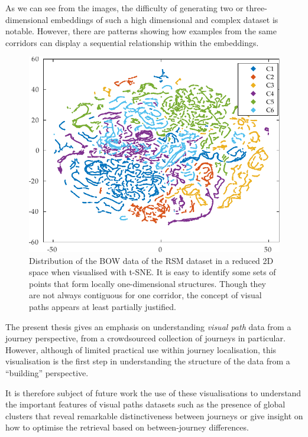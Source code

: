 As we can see from the images, the difficulty of generating two or three-dimensional embeddings of such a high dimensional and complex dataset is notable. However, there are patterns showing how examples from the same corridors can display a sequential relationship within the embeddings.


\begin{figure}
\centering
\includegraphics[width=\textwidth]{gfx/Chapter04/tsne_dsift_2d.pdf}
\caption{Distribution of the BOW data of the RSM dataset in a reduced 2D space when visualised with t-SNE. It is easy to identify some sets of points that form locally one-dimensional structures. Though they are not always contiguous for one corridor, the concept of visual paths appears at least partially justified.}
\label{fig:tsne2d}
\end{figure}

The present thesis gives an emphasis on understanding \textit{visual path} data from a journey perspective, from a crowdsourced collection of journeys in particular. However, although of limited practical use within journey localisation, this visualisation is the first step in understanding the structure of the data from a ``building'' perspective.

It is therefore subject of future work the use of these visualisations to understand the important features of visual paths datasets such as the presence of global clusters that reveal remarkable distinctiveness between journeys or give insight on how to optimise the retrieval based on between-journey differences.

